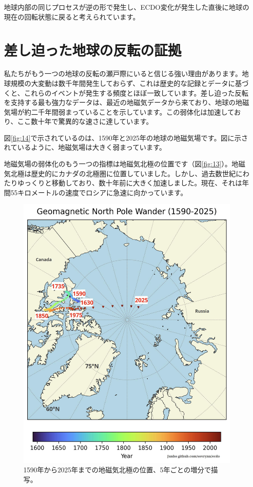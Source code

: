\documentclass[10pt,twocolumn,letterpaper]{article}
\begin{document}
地球内部の同じプロセスが逆の形で発生し、ECDO変化が発生した直後に地球の現在の回転状態に戻ると考えられています。

\section{差し迫った地球の反転の証拠}

私たちがもう一つの地球の反転の瀬戸際にいると信じる強い理由があります。地球規模の大変動は数千年間発生しておらず、これは歴史的な記録とデータに基づくと、これらのイベントが発生する頻度とほぼ一致しています。差し迫った反転を支持する最も強力なデータは、最近の地磁気データから来ており、地球の地磁気場が約二千年間弱まっていることを示しています。この弱体化は加速しており、ここ数十年で驚異的な速さに達しています。

図\ref{fig:14}で示されているのは、1590年と2025年の地球の地磁気場です\cite{125,126}。図に示されているように、地磁気場は大きく弱まっています。

地磁気場の弱体化のもう一つの指標は地磁気北極の位置です（図\ref{fig:13}）。地磁気北極は歴史的にカナダの北極圏に位置していました。しかし、過去数世紀にわたりゆっくりと移動しており、数十年前に大きく加速しました。現在、それは年間55キロメートルの速度でロシアに急速に向かっています\cite{124}。


\begin{figure}[t]
\begin{center}
   \includegraphics[width=1\linewidth]{npw.jpg}
\end{center}
   \caption{1590年から2025年までの地磁気北極の位置、5年ごとの増分で描写\cite{142}。}
\label{fig:13}
\label{fig:onecol}
\end{figure}
\end{document}
